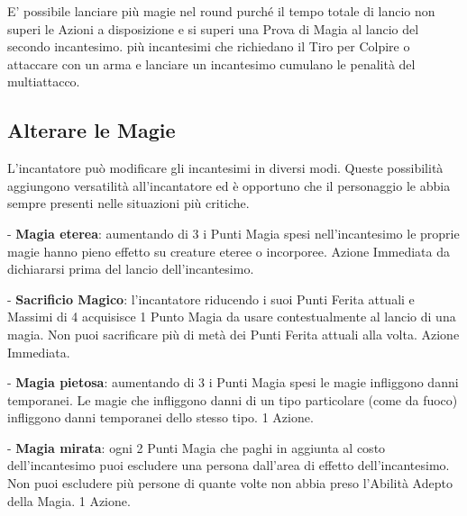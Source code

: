 \begin{multicols}{2}
E' possibile lanciare più magie nel round purché il tempo totale di lancio non superi le Azioni a disposizione e si superi una Prova di Magia al lancio del secondo incantesimo. più incantesimi che richiedano il Tiro per Colpire o attaccare con un arma e lanciare un incantesimo cumulano le penalità del multiattacco.

\subsection{Alterare le Magie}\label{magiealteraremagie}

L'incantatore può modificare gli incantesimi in diversi modi. Queste possibilità aggiungono versatilità all'incantatore ed è opportuno che il personaggio le abbia sempre presenti nelle situazioni più critiche.


- \textbf{Magia eterea}: aumentando di 3 i Punti Magia spesi nell'incantesimo le proprie magie hanno pieno effetto su creature eteree o incorporee. Azione Immediata da dichiararsi prima del lancio dell'incantesimo.

- \textbf{Sacrificio Magico}: l'incantatore riducendo i suoi Punti Ferita attuali e Massimi di 4 acquisisce 1 Punto Magia da usare contestualmente al lancio di una magia. Non puoi sacrificare più di metà dei Punti Ferita attuali alla volta. Azione Immediata.

- \textbf{Magia pietosa}: aumentando di 3 i Punti Magia spesi le magie infliggono danni temporanei. Le magie che infliggono danni di un tipo particolare (come da fuoco) infliggono danni temporanei dello stesso tipo. 1 Azione.

- \textbf{Magia mirata}: ogni 2 Punti Magia che paghi in aggiunta al costo dell'incantesimo puoi escludere una persona dall'area di effetto dell'incantesimo. Non puoi escludere più persone di quante volte non abbia preso l'Abilità Adepto della Magia. 1 Azione. %


\end{multicols}
